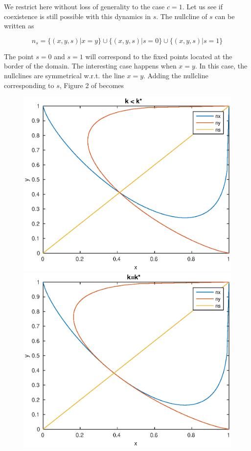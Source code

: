 \documentclass{article}
\begin{document}
We restrict here without loss of generality to the case $c=1$.
Let us see if coexistence is still possible with this dynamics in $s$.
The nullcline of $s$ can be written as

$$n_s = \{(x,y,s) | x = y \} \cup \{(x,y,s)| s = 0\} \cup \{(x,y,s) | s = 1\}$$

The point $s=0$ and $s=1$ will correspond to the fixed points located at the border of the domain.
The interesting case happens when $x=y$.
In this case, the nullclines are symmetrical w.r.t. the line $x=y$.
Adding the nullcline corresponding to $s$, Figure 2 of \cite{bilingual} becomes

\begin{figure}[H]
\centering
\includegraphics[scale=0.5]{nullpp.eps}
\includegraphics[scale=0.5]{nulle.eps}

\end{figure}
\end{document}
